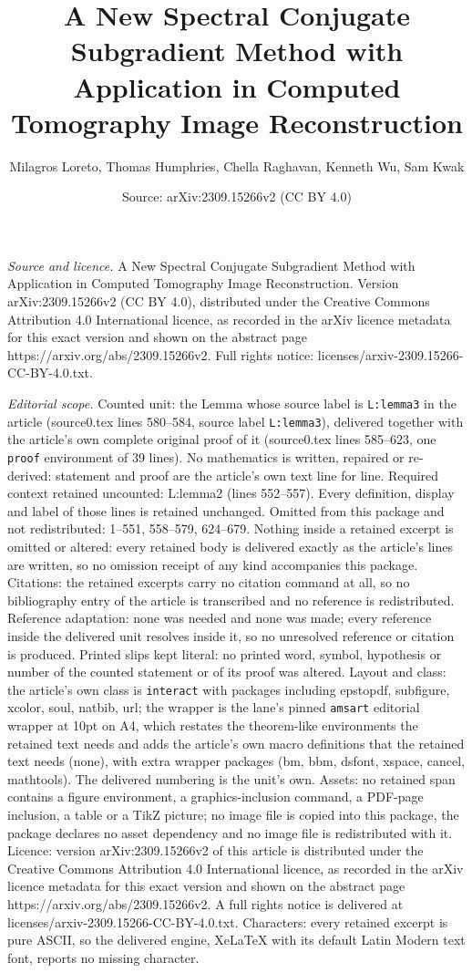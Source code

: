 \documentclass[10pt,a4paper]{amsart}
\title[A New Spectral Conjugate Subgradient Method with Application]{A New Spectral Conjugate Subgradient Method with Application in Computed Tomography Image Reconstruction}
\author{Milagros Loreto, Thomas Humphries, Chella Raghavan, Kenneth Wu, Sam Kwak}
\date{Source: arXiv:2309.15266v2 (CC BY 4.0)}
\begin{document}
\maketitle

\noindent\emph{Source and licence.} A New Spectral Conjugate Subgradient Method with Application in Computed Tomography Image Reconstruction. Version arXiv:2309.15266v2 (CC BY 4.0), distributed under the Creative Commons Attribution 4.0 International licence, as recorded in the arXiv licence metadata for this exact version and shown on the abstract page https://arxiv.org/abs/2309.15266v2. Full rights notice: licenses/arxiv-2309.15266-CC-BY-4.0.txt.\par\smallskip

\noindent\textit{Editorial scope.} Counted unit: the Lemma whose source label is \texttt{L:lemma3} in the article (source0.tex lines 580--584, source label \texttt{L:lemma3}), delivered together with the article's own complete original proof of it (source0.tex lines 585--623, one \texttt{proof} environment of 39 lines). No mathematics is written, repaired or re-derived: statement and proof are the article's own text line for line. Required context retained uncounted: L:lemma2 (lines 552--557). Every definition, display and label of those lines is retained unchanged. Omitted from this package and not redistributed: 1--551, 558--579, 624--679. Nothing inside a retained excerpt is omitted or altered: every retained body is delivered exactly as the article's lines are written, so no omission receipt of any kind accompanies this package. Citations: the retained excerpts carry no citation command at all, so no bibliography entry of the article is transcribed and no reference is redistributed. Reference adaptation: none was needed and none was made; every reference inside the delivered unit resolves inside it, so no unresolved reference or citation is produced. Printed slips kept literal: no printed word, symbol, hypothesis or number of the counted statement or of its proof was altered. Layout and class: the article's own class is \texttt{interact} with packages including epstopdf, subfigure, xcolor, soul, natbib, url; the wrapper is the lane's pinned \texttt{amsart} editorial wrapper at 10pt on A4, which restates the theorem-like environments the retained text needs and adds the article's own macro definitions that the retained text needs (none), with extra wrapper packages (bm, bbm, dsfont, xspace, cancel, mathtools). The delivered numbering is the unit's own. Assets: no retained span contains a figure environment, a graphics-inclusion command, a PDF-page inclusion, a table or a TikZ picture; no image file is copied into this package, the package declares no asset dependency and no image file is redistributed with it. Licence: version arXiv:2309.15266v2 of this article is distributed under the Creative Commons Attribution 4.0 International licence, as recorded in the arXiv licence metadata for this exact version and shown on the abstract page https://arxiv.org/abs/2309.15266v2. A full rights notice is delivered at licenses/arxiv-2309.15266-CC-BY-4.0.txt. Characters: every retained excerpt is pure ASCII, so the delivered engine, XeLaTeX with its default Latin Modern text font, reports no missing character.
\end{document}

